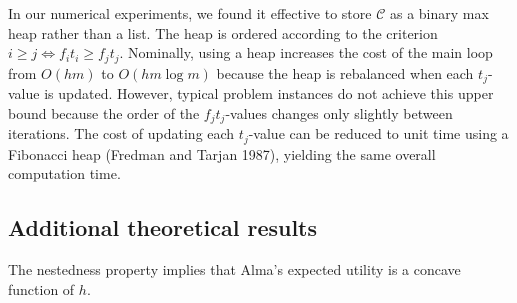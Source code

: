 \documentclass[12pt]{article} %
\newtheorem{proposition}{Proposition}
\theoremstyle{definition}
\newtheorem{proposition}{제의}
\theoremstyle{definition}
\begin{document}
In our numerical experiments, we found it effective to store $\mathcal{C}$ as a binary max heap rather than a list. The heap is ordered according to the criterion $i \geq j \iff f_i t_i \geq f_j t_j$. Nominally, using a heap increases the cost of the main loop from $O(h m)$ to $O(hm \log m)$ because the heap is rebalanced when each $t_j$-value is updated. However, typical problem instances do not achieve this upper bound because the order of the $f_j t_j$-values changes only slightly between iterations. The cost of updating each $t_j$-value can be reduced to unit time using a Fibonacci heap (Fredman and Tarjan 1987), yielding the same overall computation time. 


\subsection{Additional theoretical results}
The nestedness property implies that Alma's expected utility is a concave function of $h$.
\end{document}
